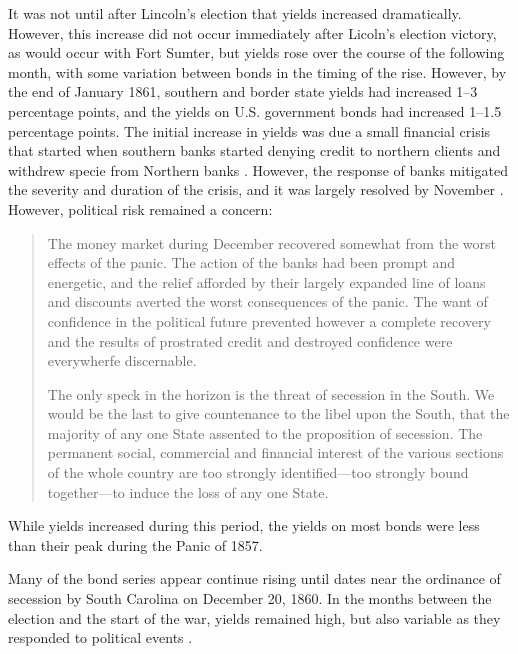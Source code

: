 \documentclass[11pt, oneside, article]{memoir}\usepackage[]{graphicx}\usepackage[]{color}
\begin{document}
It was not until after Lincoln's election that yields increased dramatically.
However, this increase did not occur immediately after Licoln's election victory, as would occur with Fort Sumter, but yields rose over the course of the following month, with some variation between bonds in the timing of the rise.
However, by the end of January 1861, southern and border state yields had increased 1--3 percentage points, and the yields on U.S. government bonds had increased 1--1.5 percentage points.
The initial increase in yields was due a small financial crisis that started when southern banks started denying credit to northern clients and withdrew specie from Northern banks \parencite[76]{HomansDana1861a}.
However, the response of banks mitigated the severity and duration of the crisis, and it was largely resolved by November \parencite[539-542]{BankersMagazine1861}.
However, political risk remained a concern:
\begin{quote}
\item The money market during December recovered somewhat from the worst effects of the panic.
  The action of the banks had been prompt and energetic, and the relief afforded by their largely expanded line of loans and discounts averted the worst consequences of the panic.
  The want of confidence in the political future prevented however a complete recovery and the results of prostrated credit and destroyed confidence were everywherfe discernable. \parencite[\textit{Bankers' Magazine}, January 1861:][541]{BankersMagazine1861}

  The only speck in the horizon is the threat of secession in the South.
  We would be the last to give countenance to the libel upon the South, that the majority of any one State assented to the proposition of secession.
  The permanent social, commercial and financial interest of the various sections of the whole country are too strongly identified---too strongly bound together---to induce the loss of any one State. \parencites[\textit{Bankers' Magazine}, December 1860:][419]{BankersMagazine1861}
\end{quote}
While yields increased during this period, the yields on most bonds were less than their peak during the Panic of 1857.

Many of the bond series appear continue rising until dates near the ordinance of secession by South Carolina on December 20, 1860.
In the months between the election and the start of the war, yields remained high, but also variable as they responded to political events \parencites[718]{HuntKettellHomansEtAl1860}[78,198,416,677]{HomansDana1861a}[413,481,669,756,838]{BankersMagazine1861}.%
\end{document}
